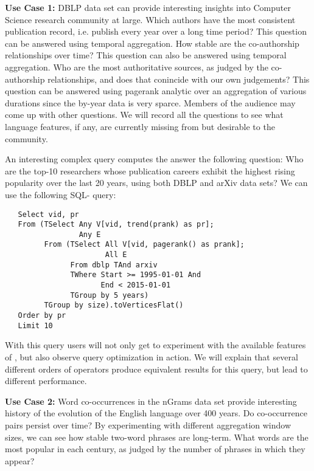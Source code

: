{\bf Use Case 1:} DBLP data set can provide interesting insights into
Computer Science research community at large.  Which authors have the
most consistent publication record, i.e. publish every year over a
long time period? This question can be answered using temporal
aggregation.  How stable are the co-authorship relationships over
time? This question can also be answered using temporal aggregation.
Who are the most authoritative sources, as judged by the co-authorship
relationships, and does that conincide with our own judgements?  This
question can be answered using pagerank analytic over an aggregation
of various durations since the by-year data is very sparce.  Members
of the audience may come up with other questions.  We will record all
the questions to see what language features, if any, are currently
missing from \ql but desirable to the community.

An interesting complex query computes the answer the following
question: Who are the top-10 researchers whose publication careers
exhibit the highest rising popularity over the last 20 years, using
both DBLP and arXiv data sets?  We can use the following SQL-\ql
query:

\begin{small}
\begin{verbatim}
   Select vid, pr
   From (TSelect Any V[vid, trend(prank) as pr];
                 Any E
         From (TSelect All V[vid, pagerank() as prank]; 
                       All E
               From dblp TAnd arxiv
               TWhere Start >= 1995-01-01 And
                      End < 2015-01-01
               TGroup by 5 years)
         TGroup by size).toVerticesFlat()
   Order by pr
   Limit 10
\end{verbatim}
\end{small}

With this query users will not only get to experiment with the
available features of \ql, but also observe query optimization in
action.  We will explain that several different orders of operators
produce equivalent results for this query, but lead to different
performance.  

{\bf Use Case 2:} Word co-occurrences in the nGrams data set provide
interesting history of the evolution of the English language over 400
years.  Do co-occurrence pairs persist over time?  By experimenting
with different aggregation window sizes, we can see how stable
two-word phrases are long-term.  What words are the most popular in
each century, as judged by the number of phrases in which they appear?

